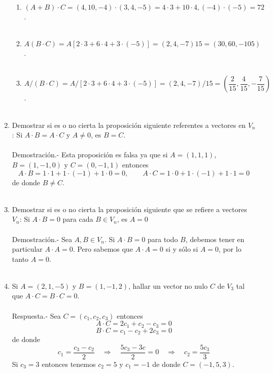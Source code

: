 \begin{enumerate}
\begin{enumerate}[\bfseries (a)]
    \item $(A+B)\cdot C = (4,10,-4)\cdot (3,4,-5) = 4\cdot 3 + 10 \cdot 4, (-4)\cdot (-5) = 72$.\\\\

    \item $A(B\cdot C) = A\left[2\cdot 3 + 6\cdot 4 + 3\cdot (-5)\right] = (2,4,-7)15 = (30,60,-105)$.\\\\

    \item $A/(B\cdot C) = A/\left[2\cdot 3 + 6\cdot 4 + 3\cdot (-5)\right] = (2,4,-7)/15 = \left(\dfrac{2}{15},\dfrac{4}{15},-\dfrac{7}{15}\right)$.\\\\

\end{enumerate}

\item Demostrar si es o no cierta la proposición siguiente referentes a vectores en $V_n$: Si $A\cdot B=A\cdot C$ y $A\neq 0$, es $B=C$.\\\\
    Demostración.-\; Esta proposición es falsa ya que si $A=(1,1,1)$, $B=(1,-1,0)$ y $C=(0,-1,1)$ entonces $$A\cdot B = 1\cdot 1 + 1\cdot(-1)+1\cdot 0 = 0, \qquad A\cdot C = 1\cdot 0 + 1\cdot(-1)+1\cdot 1 = 0$$
    de donde $B\neq C$.\\\\ 

\item Demostrar si es o no cierta la proposición siguiente que se refiere a vectores $V_n$: Si $A\cdot B = 0$ para cada $B \in V_n$, es $A=0$ \\\\ 
    Demostración.-\; Sea $A,B \in V_n$. Si $A\cdot B = 0$ para todo $B$,  debemos tener en particular $A\cdot A = 0$. Pero sabemos que $A\cdot A = 0$ si y sólo si $A=0$, por lo tanto $A=0$.\\\\

\item Si $A=(2,1,-5)$ y $B=(1,-1,2)$, hallar un vector no nulo $C$ de $V_3$ tal que $A\cdot C=B\cdot C=0$.\\\\
    Respuesta.-\; Sea $C=(c_1,c_2,c_3)$ entonces $$A\cdot C = 2c_1+c_2-c_3=0$$ $$B\cdot C = c_1-c_2+2c_3 = 0$$
	de donde $$c_1=\dfrac{c_3-c_2}{2}\quad \Longrightarrow \quad \dfrac{5c_3 - 3c}{2}=0 \quad \Longrightarrow \quad c_2 = \dfrac{5c_3}{3}$$
	Si $c_3=3$ entonces tenemos $c_2=5$ y $c_1=-1$ de donde $C=(-1,5,3)$.\\\\


\end{enumerate}
